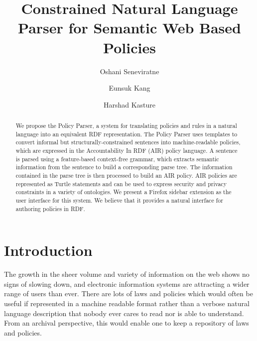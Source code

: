\documentclass{llncs}
\begin{document}
\title{Constrained Natural Language Parser for Semantic Web Based Policies}

\author{Oshani Seneviratne \and Eunsuk Kang \and Harshad Kasture}


\maketitle
\begin{abstract}

We propose the Policy Parser, a system for translating
policies and rules in a natural language into an equivalent RDF
representation. The Policy Parser uses templates to convert informal
but structurally-constrained sentences into machine-readable
policies, which are expressed in the Accountability In RDF (AIR)
policy language. A sentence is parsed using a feature-based
context-free grammar, which extracts semantic information from the
sentence to build a corresponding parse tree. The information
contained in the parse tree is then processed to build an AIR
policy. AIR policies are represented as Turtle statements and can be
used to express security and privacy constraints in a variety of
ontologies. We present a Firefox sidebar extension as the user
interface for this system. We believe that it provides a natural
interface for authoring policies in RDF.

\end{abstract}


\section{Introduction}								
\label{sec:intro}

The growth in the sheer volume and variety of information on the web
shows no signs of slowing down, and electronic information systems are
attracting a wider range of users than ever. There are lots of laws and policies which would often be useful if represented in a machine readable format rather than a verbose natural language description that nobody ever cares to read nor is able to understand. From an archival perspective, this would enable one to keep a repository of laws and policies. 
\end{document}

